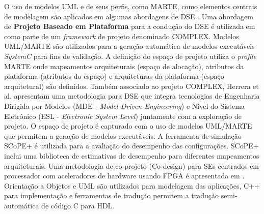 \documentclass[tese-proposta,nocipinfo]{texufpel}
\begin{document}
O uso de modelos UML \cite{gomaa2011software} e de seus perfis, como MARTE, como elementos centrais de modelagem são aplicados em algumas abordagens de DSE \cite{Herrera201455,gruttner2013complex,Pedre2016}. Uma abordagem de \textbf{Projeto Baseado em Plataforma} para a condução do DSE é utilizada em \cite{gruttner2013complex} como parte de um \textit{framework} de projeto denominado COMPLEX. Modelos UML/MARTE são utilizados para a geração automática de modelos executáveis \textit{SystemC} para fins de validação. A definição do espaço de projeto utiliza o \textit{profile} MARTE onde mapeamentos arquiteturais (espaço de alocação), atributos da plataforma (atributos do espaço) e arquiteturas da plataforma (espaço arquitetural) são definidos. Também associado ao projeto COMPLEX, Herrera et al. \cite{Herrera201455} apresentam uma metodologia para DSE que integra tecnologias de Engenharia Dirigida por Modelos (MDE - \textit{Model Driven Engineering}) e Nível do Sistema Eletrônico (ESL - \textit{Electronic System Level}) juntamente com a exploração de projeto. O espaço de projeto é capturado com o uso de modelos UML/MARTE que permitem a geração de modelos executáveis. A ferramenta de simulação SCoPE+ é utilizada para a avaliação do desempenho das configurações. SCoPE+ inclui uma biblioteca de estimativas de desempenho para diferentes mapeamentos arquiteturais. Uma metodologia de co-projeto (Co-design) para SEs centrados em processador com aceleradores de hardware usando FPGA é apresentada em \cite{Pedre2016}. Orientação a Objetos e UML são utilizados para modelagem das aplicações, C++ para implementação e ferramentas de tradução permitem a tradução semi-automática de código C para HDL.

\end{document}
